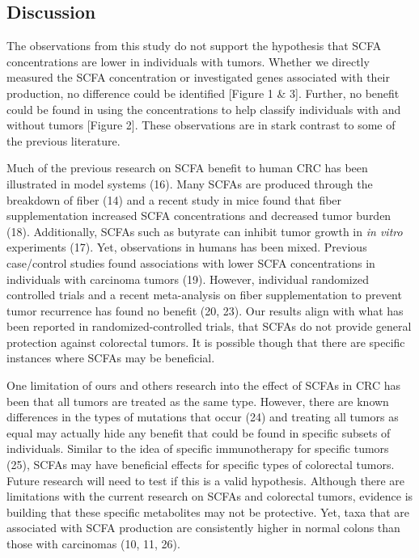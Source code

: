 \documentclass[11pt,]{article}
\begin{document}
\newpage

\subsection{Discussion}\label{discussion}

The observations from this study do not support the hypothesis that SCFA
concentrations are lower in individuals with tumors. Whether we directly
measured the SCFA concentration or investigated genes associated with
their production, no difference could be identified {[}Figure 1 \& 3{]}.
Further, no benefit could be found in using the concentrations to help
classify individuals with and without tumors {[}Figure 2{]}. These
observations are in stark contrast to some of the previous literature.

Much of the previous research on SCFA benefit to human CRC has been
illustrated in model systems (16). Many SCFAs are produced through the
breakdown of fiber (14) and a recent study in mice found that fiber
supplementation increased SCFA concentrations and decreased tumor burden
(18). Additionally, SCFAs such as butyrate can inhibit tumor growth in
\emph{in vitro} experiments (17). Yet, observations in humans has been
mixed. Previous case/control studies found associations with lower SCFA
concentrations in individuals with carcinoma tumors (19). However,
individual randomized controlled trials and a recent meta-analysis on
fiber supplementation to prevent tumor recurrence has found no benefit
(20, 23). Our results align with what has been reported in
randomized-controlled trials, that SCFAs do not provide general
protection against colorectal tumors. It is possible though that there
are specific instances where SCFAs may be beneficial.

One limitation of ours and others research into the effect of SCFAs in
CRC has been that all tumors are treated as the same type. However,
there are known differences in the types of mutations that occur (24)
and treating all tumors as equal may actually hide any benefit that
could be found in specific subsets of individuals. Similar to the idea
of specific immunotherapy for specific tumors (25), SCFAs may have
beneficial effects for specific types of colorectal tumors. Future
research will need to test if this is a valid hypothesis. Although there
are limitations with the current research on SCFAs and colorectal
tumors, evidence is building that these specific metabolites may not be
protective. Yet, taxa that are associated with SCFA production are
consistently higher in normal colons than those with carcinomas (10, 11,
26).
\end{document}
